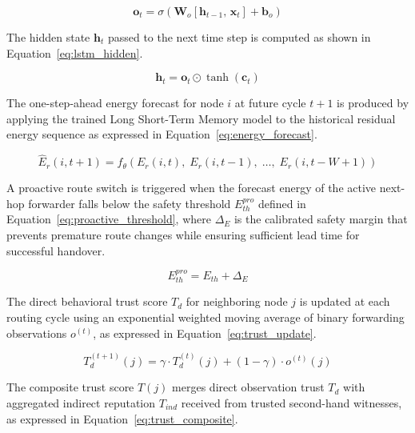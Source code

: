 \documentclass[a4paper,fleqn]{cas-dc}
\numberwithin{equation}{section}
\begin{document}
\begin{equation}
\label{eq:lstm_output}
\mathbf{o}_t = \sigma\!\left(
\mathbf{W}_o \left[\mathbf{h}_{t-1},\, \mathbf{x}_t\right]
+ \mathbf{b}_o \right)
\end{equation}

The hidden state $\mathbf{h}_t$ passed to the next time step is
computed as shown in Equation~\ref{eq:lstm_hidden}.

\begin{equation}
\label{eq:lstm_hidden}
\mathbf{h}_t = \mathbf{o}_t \odot \tanh(\mathbf{c}_t)
\end{equation}

The one-step-ahead energy forecast for node $i$ at future cycle
$t+1$ is produced by applying the trained Long Short-Term Memory
model to the historical residual energy sequence as expressed in
Equation~\ref{eq:energy_forecast}.

\begin{equation}
\label{eq:energy_forecast}
\hat{E}_r(i, t+1) = f_\theta\!\left(
E_r(i,t),\; E_r(i,t-1),\; \ldots,\; E_r(i,t-W+1)\right)
\end{equation}

A proactive route switch is triggered when the forecast energy of
the active next-hop forwarder falls below the safety threshold
$E_{th}^{pro}$ defined in Equation~\ref{eq:proactive_threshold},
where $\Delta_E$ is the calibrated safety margin that prevents
premature route changes while ensuring sufficient lead time for
successful handover.

\begin{equation}
\label{eq:proactive_threshold}
E_{th}^{pro} = E_{th} + \Delta_E
\end{equation}

The direct behavioral trust score $T_d$ for neighboring node $j$
is updated at each routing cycle using an exponential weighted moving
average of binary forwarding observations $o^{(t)}$, as expressed in
Equation~\ref{eq:trust_update}.

\begin{equation}
\label{eq:trust_update}
T_d^{(t+1)}(j) = \gamma \cdot T_d^{(t)}(j)
               + (1 - \gamma) \cdot o^{(t)}(j)
\end{equation}

The composite trust score $T(j)$ merges direct observation trust
$T_d$ with aggregated indirect reputation $T_{ind}$ received from
trusted second-hand witnesses, as expressed in
Equation~\ref{eq:trust_composite}.
\end{document}
